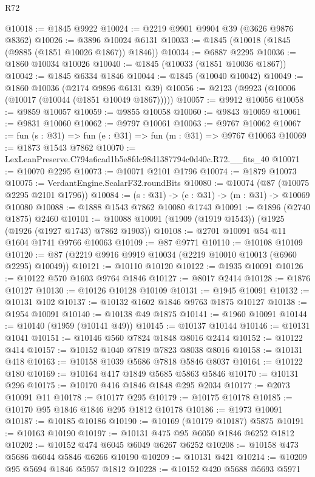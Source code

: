 \begin{lexlean}{R72}
\begin{coremodule}
@10018 := @1845 @9922
@10024 := @2219 @9901 @9904 @39 (@3626 @9876 @8362)
@10026 := @3896 @10024 @6131
@10033 := @1845 (@10018 (@1845 (@9885 (@1851 @10026 @1867)) @1846))
@10034 := @6887 @2295
@10036 := @1860 @10034 @10026
@10040 := @1845 (@10033 (@1851 @10036 @1867))
@10042 := @1845 @6334 @1846
@10044 := @1845 (@10040 @10042)
@10049 := @1860 @10036 (@2174 @9896 @6131 @39)
@10056 := @2123 (@9923 (@10006 (@10017 (@10044 (@1851 @10049 @1867)))))
@10057 := @9912 @10056
@10058 := @9859 @10057
@10059 := @9855 @10058
@10060 := @9843 @10059
@10061 := @9831 @10060
@10062 := @9797 @10061
@10063 := @9767 @10062
@10067 := fun (s : @31) => fun (e : @31) => fun (m : @31) => @9767 @10063
@10069 := @1873 @1543 @7862
@10070 := LexLeanPreserve.C794a6cad1b5e8fdc98d1387794c0d40c.R72.__fits_40
@10071 := @10070 @2295
@10073 := @10071 @2101 @1796
@10074 := @1879 @10073
@10075 := VerdantEngine.ScalarF32.roundBits
@10080 := @10074 (@87 (@10075 @2295 @2101 @1796))
@10084 := (s : @31) -> (e : @31) -> (m : @31) -> @10069 @10080
@10088 := @1888 @1543 @7862 @10080 @1743
@10091 := @1896 (@2740 @1875) @2460
@10101 := @10088 @10091 (@1909 (@1919 @1543)) (@1925 (@1926 (@1927 @1743) @7862 @1903))
@10108 := @2701 @10091 @54 @11 @1604 @1741 @9766 @10063
@10109 := @87 @9771
@10110 := @10108 @10109
@10120 := @87 (@2219 @9916 @9919 @10034 (@2219 @10010 @10013 (@6960 @2295) @10049))
@10121 := @10110 @10120
@10122 := @1935 @10091
@10126 := @10122 @570 @1603 @9764 @1846
@10127 := @8017 @2414
@10128 := @1876 @10127
@10130 := @10126 @10128 @10109
@10131 := @1945 @10091
@10132 := @10131 @102
@10137 := @10132 @1602 @1846 @9763 @1875 @10127
@10138 := @1954 @10091
@10140 := @10138 @49 @1875
@10141 := @1960 @10091
@10144 := @10140 (@1959 (@10141 @49))
@10145 := @10137 @10144
@10146 := @10131 @1041
@10151 := @10146 @560 @7824 @1848 @8016 @2414
@10152 := @10122 @414
@10157 := @10152 @1040 @7819 @7823 @8038 @8016
@10158 := @10131 @418
@10163 := @10158 @1039 @5686 @7818 @5846 @8037
@10164 := @10122 @180
@10169 := @10164 @417 @1849 @5685 @5863 @5846
@10170 := @10131 @296
@10175 := @10170 @416 @1846 @1848 @295 @2034
@10177 := @2073 @10091 @11
@10178 := @10177 @295
@10179 := @10175 @10178
@10185 := @10170 @95 @1846 @1846 @295 @1812 @10178
@10186 := @1973 @10091
@10187 := @10185 @10186
@10190 := @10169 (@10179 @10187) @5875
@10191 := @10163 @10190
@10197 := @10131 @475 @95 @6050 @1846 @6252 @1812
@10202 := @10152 @474 @6045 @6049 @6267 @6252
@10208 := @10158 @473 @5686 @6044 @5846 @6266 @10190
@10209 := @10131 @421
@10214 := @10209 @95 @5694 @1846 @5957 @1812
@10228 := @10152
    @420
    @5688
    @5693
    @5971

\end{coremodule}
\end{lexlean}

